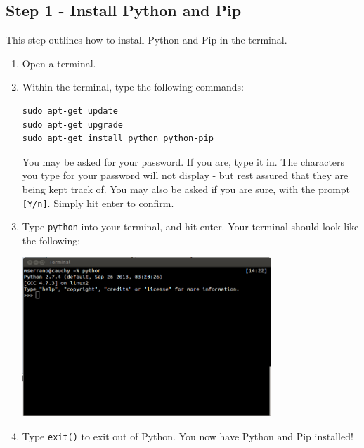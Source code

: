 \documentclass{article}
\begin{document}
\subsection{Step 1 - Install Python and Pip}
This step outlines how to install Python and Pip in the terminal.
\begin{enumerate}
\item Open a terminal.
\item Within the terminal, type the following commands:
\begin{verbatim}
sudo apt-get update
sudo apt-get upgrade
sudo apt-get install python python-pip
\end{verbatim}
You may be asked for your password. If you are, type it in. The characters you type for your password
will not display - but rest assured that they are being kept track of. You may 
also be asked if you are sure, with the prompt \verb+[Y/n]+. Simply hit enter
to confirm.
\item Type \verb+python+ into your terminal, and hit enter. Your terminal should look like
the following:

\includegraphics[height=6cm]{pic1.png}

\item Type \verb+exit()+ to exit out of Python. You now have Python and Pip installed!
\end{enumerate}
\end{document}
